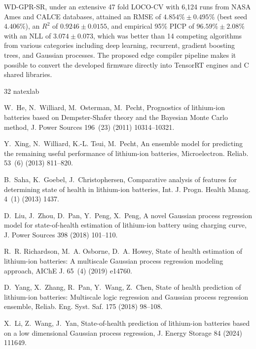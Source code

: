 \documentclass[a4paper,fleqn]{cas-sc}
\begin{document}
WD-GPR-SR, under an extensive 47 fold LOCO-CV with 6,124 runs from NASA Ames and CALCE databases, attained an RMSE of $4.854\% \pm 0.495\%$ (best seed $4.406\%$), an $R^2$ of $0.9246 \pm 0.0155$, and empirical 95\% PICP of $96.59\% \pm 2.08\%$ with an NLL of $3.074 \pm 0.073$, which was better than 14 competing algorithms from various categories including deep learning, recurrent, gradient boosting trees, and Gaussian processes. The proposed edge compiler pipeline makes it possible to convert the developed firmware directly into TensorRT engines and C shared libraries.

\begin{thebibliography}{32}
\small
\setlength{\bibsep}{2.5pt}
\expandafter\ifx\csname natexlab\endcsname\relax\def\natexlab#1{#1}\fi
\providecommand{\url}[1]{\texttt{#1}}

W.~He, N.~Williard, M.~Osterman, M.~Pecht, Prognostics of lithium-ion batteries based on Dempster-Shafer theory and the Bayesian Monte Carlo method, J. Power Sources 196~(23) (2011) 10314--10321.

Y.~Xing, N.~Williard, K.-L. Tsui, M.~Pecht, An ensemble model for predicting the remaining useful performance of lithium-ion batteries, Microelectron. Reliab. 53~(6) (2013) 811--820.

B.~Saha, K.~Goebel, J.~Christophersen, Comparative analysis of features for determining state of health in lithium-ion batteries, Int. J. Progn. Health Manag. 4~(1) (2013) 1437.

D.~Liu, J.~Zhou, D.~Pan, Y.~Peng, X.~Peng, A novel Gaussian process regression model for state-of-health estimation of lithium-ion battery using charging curve, J. Power Sources 398 (2018) 101--110.

R.~R. Richardson, M.~A. Osborne, D.~A. Howey, State of health estimation of lithium-ion batteries: A multiscale Gaussian process regression modeling approach, AIChE J. 65~(4) (2019) e14760.

D.~Yang, X.~Zhang, R.~Pan, Y.~Wang, Z.~Chen, State of health prediction of lithium-ion batteries: Multiscale logic regression and Gaussian process regression ensemble, Reliab. Eng. Syst. Saf. 175 (2018) 98--108.

X.~Li, Z.~Wang, J.~Yan, State-of-health prediction of lithium-ion batteries based on a low dimensional Gaussian process regression, J. Energy Storage 84 (2024) 111649.


\end{thebibliography}
\end{document}
